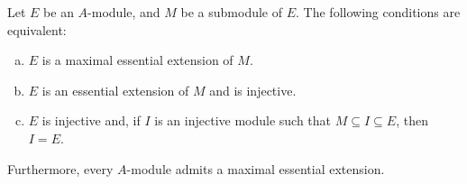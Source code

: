\begin{theorem}
\label{thm:maximal-essential-extension-equivalences}
Let \(E\) be an \(A\)-module, and \(M\) be a submodule of \(E\). The following
conditions are equivalent:
\begin{enumerate}[(a)]\setlength\itemsep{0em}
\item \(E\) is a maximal essential extension of \(M\).

\item \(E\) is an essential extension of \(M\) and is injective.

\item \(E\) is injective and, if \(I\) is an injective module such that \(M \subseteq I
  \subseteq E\), then \(I = E\).
\end{enumerate}
Furthermore, every \(A\)-module admits a maximal essential extension.
\end{theorem}

